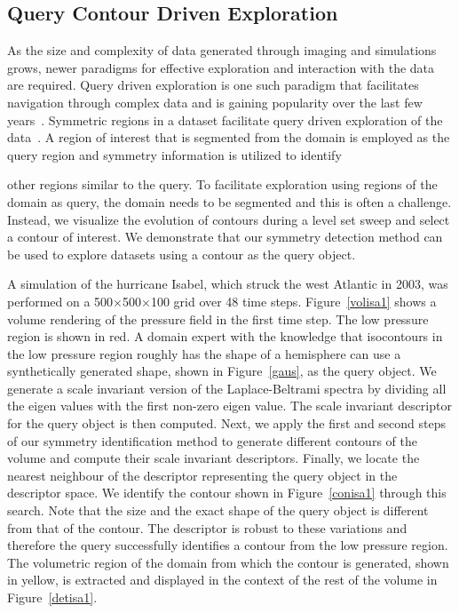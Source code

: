 \documentclass[review,journal]{vgtc}         %
\begin{document}
\subsection{Query Contour Driven Exploration}
As the size and complexity of data generated through imaging and simulations
grows, newer paradigms for effective exploration and interaction with
the data are required. Query driven exploration is one such paradigm that
facilitates navigation through complex data and is gaining popularity over the last few
years~\cite{BeyerAKLPH13,LiuJH13}. Symmetric regions in a dataset facilitate query
driven exploration of the data~\cite{ThomN13,MasoodTN13}. A region of interest that is segmented from 
the domain is employed as the query region and symmetry information is utilized to identify

other regions similar to the query. To facilitate exploration using regions of the domain as query, the domain 
needs to be segmented and this is often a challenge. Instead, we visualize the
evolution of contours during a level set sweep and select a contour of interest. 
We demonstrate that our symmetry detection method can be used to explore datasets using a contour as the query object.

A simulation of the hurricane Isabel, which struck the west Atlantic in 2003, was performed
on a 500$\times$500$\times$100 grid over 48 time steps. Figure~\ref{volisa1} shows a volume rendering
of the pressure field in the first time step. The low pressure region
is shown in red. A domain expert with the knowledge that isocontours in the low pressure region
roughly has the shape of a hemisphere can use a synthetically generated shape, shown in 
Figure~\ref{gaus}, as the query object. We generate a scale invariant version of the Laplace-Beltrami
spectra by dividing all the eigen values with the first non-zero eigen value. The scale invariant
descriptor for the query object is then computed. Next, we apply the first and second steps of
our symmetry identification method to generate different contours of the 
volume and compute their scale invariant descriptors. Finally, we locate the nearest neighbour of the descriptor 
representing the query object in the descriptor space. We identify the contour
shown in Figure~\ref{conisa1} through this search. Note that the size and the exact shape of the
query object is different from that of the contour.
The descriptor is robust to these variations and therefore the query successfully identifies 
a contour from the low pressure region. The volumetric region of the domain from which the contour
is generated, shown in yellow, is extracted and displayed in the context of the rest of the volume in 
Figure~\ref{detisa1}. 
\end{document}

